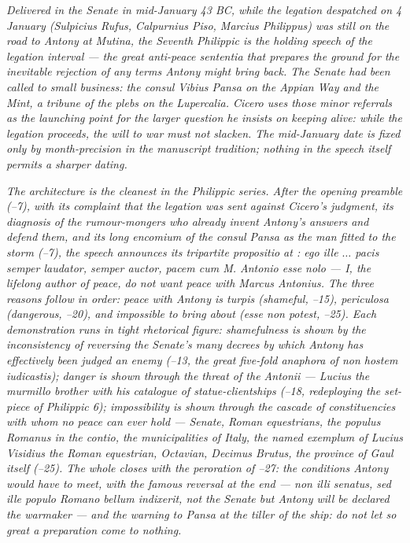 
\textit{Delivered in the Senate in mid-January 43 BC, while the
legation despatched on 4 January (Sulpicius Rufus, Calpurnius
Piso, Marcius Philippus) was still on the road to Antony at
Mutina, the Seventh Philippic is the holding speech of the
legation interval --- the great anti-peace \textit{sententia}
that prepares the ground for the inevitable rejection of any
terms Antony might bring back. The Senate had been called to
small business: the consul Vibius Pansa on the Appian Way and
the Mint, a tribune of the plebs on the Lupercalia. Cicero uses
those minor referrals as the launching point for the larger
question he insists on keeping alive: while the legation
proceeds, the will to war must not slacken. The mid-January
date is fixed only by month-precision in the manuscript
tradition; nothing in the speech itself permits a sharper
dating.}

\textit{The architecture is the cleanest in the Philippic
series. After the opening preamble (--7), with
its complaint that the legation was sent against Cicero's
judgment, its diagnosis of the rumour-mongers who already
invent Antony's answers and defend them, and its long
encomium of the consul Pansa as the man fitted to the storm
(--7), the speech announces its tripartite
\textit{propositio} at : \textit{ego ille
$\ldots$ pacis semper laudator, semper auctor, pacem cum
M. Antonio esse nolo} --- I, the lifelong author of peace, do
not want peace with Marcus Antonius. The three reasons follow
in order: peace with Antony is \textit{turpis} (shameful,
--15), \textit{periculosa} (dangerous,
--20), and impossible to bring about
(\textit{esse non potest}, --25). Each
demonstration runs in tight rhetorical figure: shamefulness is
shown by the inconsistency of reversing the Senate's many
decrees by which Antony has effectively been judged an enemy
(--13, the great five-fold anaphora of
\textit{non hostem iudicastis}); danger is shown through
the threat of \textit{the Antonii} --- Lucius the murmillo
brother with his catalogue of statue-clientships
(--18, redeploying the set-piece of Philippic 6);
impossibility is shown through the cascade of constituencies
with whom no peace can ever hold --- Senate, Roman equestrians,
the populus Romanus in the contio, the municipalities of
Italy, the named exemplum of Lucius Visidius the Roman
equestrian, Octavian, Decimus Brutus, the province of Gaul
itself (--25). The whole closes with the
peroration of --27: the conditions Antony
would have to meet, with the famous reversal at the end ---
\textit{non illi senatus, sed ille populo Romano bellum
indixerit}, not the Senate but Antony will be declared the
warmaker --- and the warning to Pansa at the tiller of the
ship: do not let so great a preparation come to nothing.}

